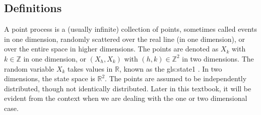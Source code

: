 \documentclass[10pt]{article}
\begin{document}
\subsection{Definitions}\label{s:def}

A \textcolor{index}{point process} is a (usually infinite) collection of points, sometimes called events in one dimension, randomly scattered over the real line (in one dimension), or over the entire space in higher dimensions. The points are denoted as $X_k$ with $k\in\mathbb{Z}$ in one dimension, or $(X_h,X_k)$ with $(h,k)\in \mathbb{Z}^2$ in two dimensions. The random variable $X_k$ takes values in $\mathbb{R}$, known as the 
\gls{gls:state1}
. 
In two dimensions, the state space is $\mathbb{R}^2$. The points are assumed to be independently distributed, though not identically distributed. Later in this textbook, it will be evident from the context when we are dealing with the one or two dimensional case. 
\end{document}
